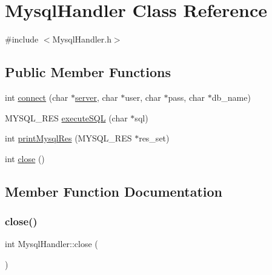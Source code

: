 \hypertarget{classMysqlHandler}{}\section{Mysql\+Handler Class Reference}
\label{classMysqlHandler}


{\ttfamily \#include $<$Mysql\+Handler.\+h$>$}

\subsection*{Public Member Functions}
\begin{DoxyCompactItemize}
\item 
int \hyperlink{classMysqlHandler_acd74d4ee6a2853d07218cd7a300ee6d2}{connect} (char $\ast$\hyperlink{main_8h_afd1a82c786509e03b540bae82af2c137}{server}, char $\ast$user, char $\ast$pass, char $\ast$db\+\_\+name)
\item 
M\+Y\+S\+Q\+L\+\_\+\+R\+ES \hyperlink{classMysqlHandler_abee4d47196df8c42420fe771508a6ff9}{execute\+S\+QL} (char $\ast$sql)
\item 
int \hyperlink{classMysqlHandler_affb80fba704894dca83d563f6582edc0}{print\+Mysql\+Res} (M\+Y\+S\+Q\+L\+\_\+\+R\+ES $\ast$res\+\_\+set)
\item 
int \hyperlink{classMysqlHandler_aef277d872eb51db9ce2fe66fed348941}{close} ()
\end{DoxyCompactItemize}


\subsection{Member Function Documentation}
\mbox{\label{classMysqlHandler_aef277d872eb51db9ce2fe66fed348941}} 
\subsubsection{\texorpdfstring{close()}{close()}}
{\footnotesize\ttfamily int Mysql\+Handler\+::close (\begin{DoxyParamCaption}{ }\end{DoxyParamCaption})}

\mbox{\label{classMysqlHandler_acd74d4ee6a2853d07218cd7a300ee6d2}} 
